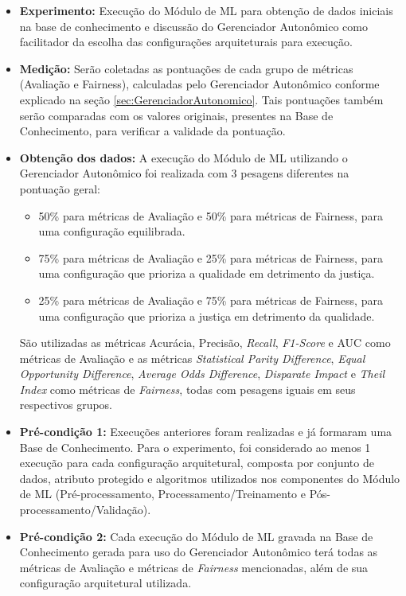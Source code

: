 \documentclass[portugues]{ic-tese}
\begin{document}
\begin{itemize}
\item \textbf{Experimento:} Execução do Módulo de ML para obtenção de dados iniciais na base de conhecimento e discussão do Gerenciador Autonômico como facilitador da escolha das configurações arquiteturais para execução.

\item \textbf{Medição:} Serão coletadas as pontuações de cada grupo de métricas (Avaliação e Fairness), calculadas pelo Gerenciador Autonômico conforme explicado na seção \ref{sec:GerenciadorAutonomico}. Tais pontuações também serão comparadas com os valores originais, presentes na Base de Conhecimento, para verificar a validade da pontuação.

\item \textbf{Obtenção dos dados:} A execução do Módulo de ML utilizando o Gerenciador Autonômico foi realizada com 3 pesagens diferentes na pontuação geral:

\begin{itemize}
\item 50\% para métricas de Avaliação e 50\% para métricas de Fairness, para uma configuração equilibrada.
\item 75\% para métricas de Avaliação e 25\% para métricas de Fairness, para uma configuração que prioriza a qualidade em detrimento da justiça.
\item 25\% para métricas de Avaliação e 75\% para métricas de Fairness, para uma configuração que prioriza a justiça em detrimento da qualidade.
\end{itemize}

São utilizadas as métricas Acurácia, Precisão, \textit{Recall}, \textit{F1-Score} e AUC como métricas de Avaliação e as métricas \textit{Statistical Parity Difference}, \textit{Equal Opportunity Difference}, \textit{Average Odds Difference}, \textit{Disparate Impact} e \textit{Theil Index} como métricas de \textit{Fairness}, todas com pesagens iguais em seus respectivos grupos.

\item \textbf{Pré-condição 1:} Execuções anteriores foram realizadas e já formaram uma Base de Conhecimento. Para o experimento, foi considerado ao menos 1 execução para cada configuração arquitetural, composta por conjunto de dados, atributo protegido e algoritmos utilizados nos componentes do Módulo de ML (Pré-processamento, Processamento/Treinamento e Pós-processamento/Validação).

\item \textbf{Pré-condição 2:} Cada execução do Módulo de ML gravada na Base de Conhecimento gerada para uso do Gerenciador Autonômico terá todas as métricas de Avaliação e métricas de \textit{Fairness} mencionadas, além de sua configuração arquitetural utilizada.


\end{itemize}
\end{document}

